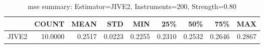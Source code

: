 \begin{table}[ht]
\centering
\caption{mse summary: Estimator=JIVE2, Instruments=200, Strength=0.80}
\begin{tabular}{lrrrrrrrr}
\toprule
 & COUNT & MEAN & STD & MIN & 25\% & 50\% & 75\% & MAX \\
\midrule
JIVE2 & 10.0000 & 0.2517 & 0.0223 & 0.2255 & 0.2310 & 0.2532 & 0.2646 & 0.2867 \\
\bottomrule
\end{tabular}
\end{table}
